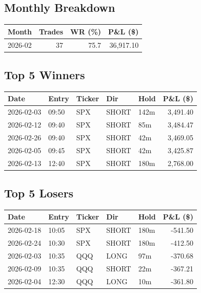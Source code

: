 \documentclass[11pt,a4paper]{article}
\begin{document}
\subsection*{Monthly Breakdown}
\noindent\begin{center}
\begin{tabular}{>{\color{txtmain}}l rrr}
\toprule
\rowcolor{cardbg}
\textbf{Month} & \textbf{Trades} & \textbf{WR (\%)} & \textbf{P\&L (\$)} \\
\midrule
2026-02 & 37 & 75.7 & \textcolor{wingreen}{36,917.10} \\
\bottomrule
\end{tabular}
\end{center}
\subsection*{Top 5 Winners}
\noindent\begin{center}
\begin{tabular}{>{\color{txtmain}}l llll r}
\toprule
\rowcolor{cardbg}
\textbf{Date} & \textbf{Entry} & \textbf{Ticker} & \textbf{Dir} & \textbf{Hold} & \textbf{P\&L (\$)} \\
\midrule
2026-02-03 & 09:50 & SPX & SHORT & 142m & \textcolor{wingreen}{3,491.40} \\
2026-02-12 & 09:40 & SPX & SHORT & 85m & \textcolor{wingreen}{3,484.47} \\
2026-02-26 & 09:40 & SPX & SHORT & 42m & \textcolor{wingreen}{3,469.05} \\
2026-02-05 & 09:45 & SPX & SHORT & 42m & \textcolor{wingreen}{3,425.87} \\
2026-02-13 & 12:40 & SPX & SHORT & 180m & \textcolor{wingreen}{2,768.00} \\
\bottomrule
\end{tabular}
\end{center}
\subsection*{Top 5 Losers}
\noindent\begin{center}
\begin{tabular}{>{\color{txtmain}}l llll r}
\toprule
\rowcolor{cardbg}
\textbf{Date} & \textbf{Entry} & \textbf{Ticker} & \textbf{Dir} & \textbf{Hold} & \textbf{P\&L (\$)} \\
\midrule
2026-02-18 & 10:05 & SPX & SHORT & 180m & \textcolor{lossred}{-541.50} \\
2026-02-24 & 10:30 & SPX & SHORT & 180m & \textcolor{lossred}{-412.50} \\
2026-02-03 & 10:35 & QQQ & LONG & 97m & \textcolor{lossred}{-370.68} \\
2026-02-09 & 10:35 & QQQ & SHORT & 22m & \textcolor{lossred}{-367.21} \\
2026-02-04 & 12:30 & QQQ & LONG & 10m & \textcolor{lossred}{-361.80} \\
\bottomrule
\end{tabular}
\end{center}
\clearpage
\end{document}
